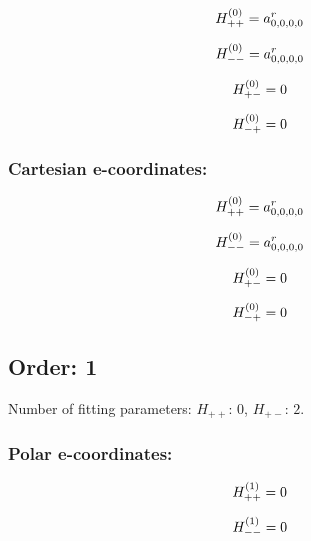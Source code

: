 \documentclass[fleqn]{article}
\begin{document}
\begin{dmath*}
H_{++}^{(0)}=a^{r}_{0,0,0,0}\\
\end{dmath*}

\begin{dmath*}
H_{--}^{(0)}=a^{r}_{0,0,0,0}\\
\end{dmath*}

\begin{dmath*}
H_{+-}^{(0)}=0\\
\end{dmath*}

\begin{dmath*}
H_{-+}^{(0)}=0\\
\end{dmath*}
\subsubsection*{Cartesian e-coordinates:}

\begin{dmath*}
H_{++}^{(0)}=a^{r}_{0,0,0,0}\\
\end{dmath*}

\begin{dmath*}
H_{--}^{(0)}=a^{r}_{0,0,0,0}\\
\end{dmath*}

\begin{dmath*}
H_{+-}^{(0)}=0\\
\end{dmath*}

\begin{dmath*}
H_{-+}^{(0)}=0\\
\end{dmath*}
\subsection{Order: 1}
Number of fitting parameters: $H_{++}$: $0$, $H_{+-}$: $2$.
\subsubsection*{Polar e-coordinates:}

\begin{dmath*}
H_{++}^{(1)}=0\\
\end{dmath*}

\begin{dmath*}
H_{--}^{(1)}=0\\
\end{dmath*}
\end{document}
